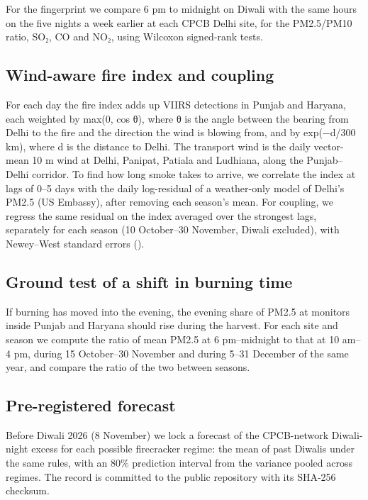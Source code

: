 \documentclass[
  11pt,
]{article}
\begin{document}
For the fingerprint we compare 6 pm to midnight on Diwali with the same
hours on the five nights a week earlier at each CPCB Delhi site, for the
PM2.5/PM10 ratio, SO₂, CO and NO₂, using Wilcoxon signed-rank tests.

\subsection{Wind-aware fire index and
coupling}\label{wind-aware-fire-index-and-coupling}

For each day the fire index adds up VIIRS detections in Punjab and
Haryana, each weighted by max(0, cos θ), where θ is the angle between
the bearing from Delhi to the fire and the direction the wind is blowing
from, and by exp(−d/300 km), where d is the distance to Delhi. The
transport wind is the daily vector-mean 10 m wind at Delhi, Panipat,
Patiala and Ludhiana, along the Punjab--Delhi corridor. To find how long
smoke takes to arrive, we correlate the index at lags of 0--5 days with
the daily log-residual of a weather-only model of Delhi's PM2.5 (US
Embassy), after removing each season's mean. For coupling, we regress
the same residual on the index averaged over the strongest lags,
separately for each season (10 October--30 November, Diwali excluded),
with Newey--West standard errors ().

\subsection{Ground test of a shift in burning
time}\label{ground-test-of-a-shift-in-burning-time}

If burning has moved into the evening, the evening share of PM2.5 at
monitors inside Punjab and Haryana should rise during the harvest. For
each site and season we compute the ratio of mean PM2.5 at 6
pm--midnight to that at 10 am--4 pm, during 15 October--30 November and
during 5--31 December of the same year, and compare the ratio of the two
between seasons.

\subsection{Pre-registered forecast}\label{pre-registered-forecast}

Before Diwali 2026 (8 November) we lock a forecast of the CPCB-network
Diwali-night excess for each possible firecracker regime: the mean of
past Diwalis under the same rules, with an 80\% prediction interval from
the variance pooled across regimes. The record is committed to the
public repository with its SHA-256 checksum.
\end{document}
